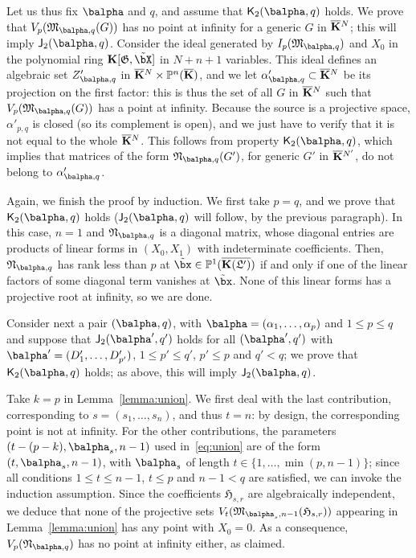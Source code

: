 \documentclass[12pt]{article}
\begin{document}
Let us thus fix $\balpha$ and $q$, and assume that $\assJ_2(\balpha,q)$
holds. We prove that $V_p(\mathfrak{M}_{\balpha,q}(G))$ has no point at
infinity for a generic $G$ in $\overline{\mathbf{K}}{}^N$; this will imply $\assI_2(\balpha,q)$. Consider the ideal generated by
$I_{p}(\mathfrak{M}_{\balpha,q})$ and $X_0$ in the polynomial ring
$\KK[\mathfrak{G},\tilde\bX]$ in $N+n+1$ variables. This ideal defines
an algebraic set $Z'_{\balpha,q}$ in $\overline{\mathbf{K}}{}^N \times \mathbb{P}^n(\overline{\mathbf{K}})$, and
we let $\alpha'_{\balpha,q} \subset \KKbar{}^N$ be its projection on the
first factor: this is thus the set of all $G$ in $\overline{\mathbf{K}}{}^N$ such
that $V_p(\mathfrak{M}_{\balpha,q}(G))$ has a point at infinity. Because
the source is a projective space, $\alpha'_{p,q}$ is closed (so its
complement is open), and we just have to verify that it is not equal
to the whole $\overline{\mathbf{K}}{}^N$. This follows from property $\assJ_2(\balpha,q)$, which implies that matrices of the form
$\mathfrak{N}_{\balpha,q}(G')$, for generic $G'$ in $\overline{\mathbf{K}}{}^{N'}$, do
not belong to $\alpha'_{\balpha,q}$.

Again, we finish the proof by induction. We first take $p=q$, and we
prove that $\assJ_2(\balpha,q)$ holds ($\assI_2(\balpha,q)$ will follow,
by the previous paragraph). In this case, $n=1$ and
$\mathfrak{N}_{\balpha,q}$ is a diagonal matrix, whose diagonal entries
are products of linear forms in $(X_0,X_1)$ with indeterminate
coefficients. Then, $\mathfrak{N}_{\balpha,q}$ has rank less than $p$ at
$\tilde\bx\in\P^1(\KKGpbar)$ if and only if one of the linear factors
of some diagonal term vanishes at $\tilde \bx$. None of this linear
forms has a projective root at infinity, so we are done.

Consider next a pair $(\balpha,q)$, with $\balpha=(\alpha_1,\dots,\alpha_p)$ and $1 \le p
\le q$ and suppose that $\assI_2(\balpha',q')$ holds for all $(\balpha',q')$
with $\balpha'=(D'_1,\dots,D'_{p'})$, $1 \le p' \le q'$, $p' \le p$ and $q' <
q$; we prove that $\assJ_2(\balpha,q)$ holds; as above, this will imply
 $\assI_2(\balpha,q)$.

Take $k=p$ in Lemma~\ref{lemma:union}. We first deal with the last
contribution, corresponding to $s=(s_1,\dots,s_n)$, and thus $t=n$: by
design, the corresponding point is not at infinity. For the other
contributions, the parameters $(t-(p-k),\balpha_s,n-1)$ used
in~\eqref{eq:union} are of the form $(t,\balpha_s,n-1)$, with $\balpha_s$ of
length $t \in \{1,\dots, \min(p,n-1)\}$; since all conditions $ 1 \le
t \le n-1$, $t \le p$ and $n-1 < q$ are satisfied, we can invoke the
induction assumption. Since the coefficients $\mathfrak{H}_{s,r}$ are
algebraically independent, we deduce that none of the
projective sets $V_t(\mathfrak{M}_{\balpha_s,n-1}(\mathfrak{H}_{s,r}))$
appearing in Lemma~\ref{lemma:union} has any point with $X_0=0$. As a
consequence, $V_p(\mathfrak{N}_{\balpha,q})$ has no point at infinity
either, as claimed.
\end{document}

